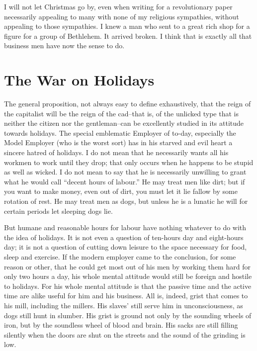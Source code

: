 \documentclass{book}
\begin{document}
I will not let Christmas go by, even when writing for a revolutionary paper necessarily appealing to many with none of my religious sympathies, without appealing to those sympathies. I knew a man who sent to a great rich shop for a figure for a group of Bethlehem. It arrived broken. I think that is exactly all that business men have now the sense to do.

\chapter{The War on Holidays}
\label{chapter-3}
The general proposition, not always easy to define exhaustively, that the reign of the capitalist will be the reign of the cad–that is, of the unlicked type that is neither the citizen nor the gentleman–can be excellently studied in its attitude towards holidays. The special emblematic Employer of to-day, especially the Model Employer (who is the worst sort) has in his starved and evil heart a sincere hatred of holidays. I do not mean that he necessarily wants all his workmen to work until they drop; that only occurs when he happens to be stupid as well as wicked. I do not mean to say that he is necessarily unwilling to grant what he would call “decent hours of labour.” He may treat men like dirt; but if you want to make money, even out of dirt, you must let it lie fallow by some rotation of rest. He may treat men as dogs, but unless he is a lunatic he will for certain periods let sleeping dogs lie.

But humane and reasonable hours for labour have nothing whatever to do with the idea of holidays. It is not even a question of ten-hours day and eight-hours day; it is not a question of cutting down leisure to the space necessary for food, sleep and exercise. If the modern employer came to the conclusion, for some reason or other, that he could get most out of his men by working them hard for only two hours a day, his whole mental attitude would still be foreign and hostile to holidays. For his whole mental attitude is that the passive time and the active time are alike useful for him and his business. All is, indeed, grist that comes to his mill, including the millers. His slaves’ still serve him in unconsciousness, as dogs still hunt in slumber. His grist is ground not only by the sounding wheels of iron, but by the soundless wheel of blood and brain. His sacks are still filling silently when the doors are shut on the streets and the sound of the grinding is low.
\end{document}
